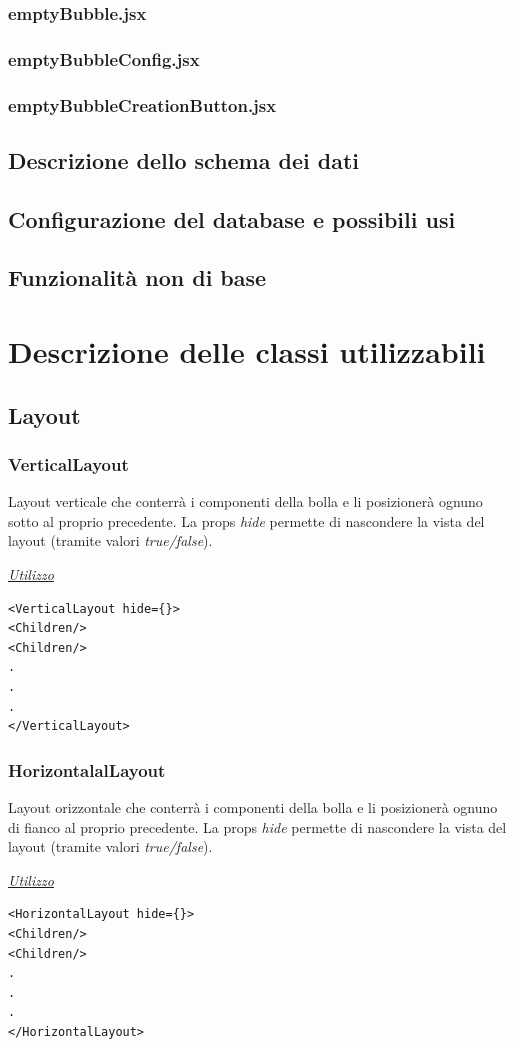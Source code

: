 \subsubsection{emptyBubble.jsx}

\subsubsection{emptyBubbleConfig.jsx}
\subsubsection{emptyBubbleCreationButton.jsx}

\subsection{Descrizione dello schema dei dati}

\subsection{Configurazione del database e possibili usi}

\subsection{Funzionalità non di base}


\section{Descrizione delle classi utilizzabili}
\subsection{Layout}
\subsubsection{VerticalLayout}
Layout verticale che conterrà i componenti della bolla e li posizionerà ognuno sotto al proprio precedente. La props \textit{hide} permette di nascondere la vista del layout (tramite valori \textit{true/false}).
\begin{center}
\underline{\textit{Utilizzo}}
\begin{lstlisting}
<VerticalLayout hide={}>
<Children/>
<Children/>
.
.
.
</VerticalLayout>
\end{lstlisting}
\end{center}


\subsubsection{HorizontalalLayout}
Layout orizzontale che conterrà i componenti della bolla e li posizionerà ognuno di fianco al proprio precedente. La props \textit{hide} permette di nascondere la vista del layout (tramite valori \textit{true/false}).
\begin{center}
\underline{\textit{Utilizzo}}
\begin{lstlisting}
<HorizontalLayout hide={}>
<Children/>
<Children/>
.
.
.
</HorizontalLayout>
\end{lstlisting}
\end{center}

